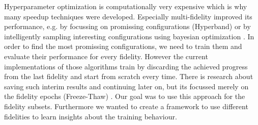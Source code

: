 Hyperparameter optimization is computationally very expensive which is why many speedup techniques were developed.
Especially multi-fidelity improved its performance, e.g. by focussing on promissing configurations (Hyperband) \cite{Li2016} or by intelligently sampling interesting configurations using bayesian optimization \cite{Falkner2018}.
In order to find the most promissing configurations, we need to train them and evaluate their performance for every fidelity.
However the current implementations of those algorithms train by discarding the achieved progress from the last fidelity and start from scratch every time.
There is research about saving such interim results and continuing later on, but its focussed merely on the fidelity epochs (Freeze-Thaw) \cite{Swersky2014}.
Our goal was to use this approach for the fidelity subsets.
Furthermore we wanted to create a framework to use different fidelities to learn insights about the training behaviour.


